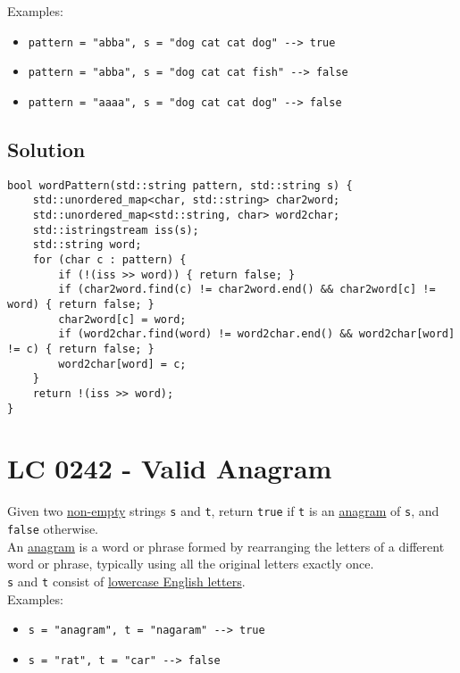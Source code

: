 {Examples:
\begin{itemize}
	\item {\colorbox{CodeBackground}{\lstinline|pattern = "abba", s = "dog cat cat dog" --> true|}}
	\item {\colorbox{CodeBackground}{\lstinline|pattern = "abba", s = "dog cat cat fish" --> false|}}
	\item {\colorbox{CodeBackground}{\lstinline|pattern = "aaaa", s = "dog cat cat dog" --> false|}}
\end{itemize}

\subsection*{Solution}
\begin{lstlisting}
bool wordPattern(std::string pattern, std::string s) {
	std::unordered_map<char, std::string> char2word;
	std::unordered_map<std::string, char> word2char;
	std::istringstream iss(s);
	std::string word;
	for (char c : pattern) {
		if (!(iss >> word)) { return false; }
		if (char2word.find(c) != char2word.end() && char2word[c] != word) { return false; }
		char2word[c] = word;
		if (word2char.find(word) != word2char.end() && word2char[word] != c) { return false; }
		word2char[word] = c;
	}
	return !(iss >> word);
}
\end{lstlisting}

\section{LC 0242 - Valid Anagram}\label{lc0242}
Given two \ul{non-empty} strings {\colorbox{CodeBackground}{\lstinline|s|}} and {\colorbox{CodeBackground}{\lstinline|t|}}, return {\colorbox{CodeBackground}{\lstinline|true|}} if {\colorbox{CodeBackground}{\lstinline|t|}} is an \ul{anagram} of {\colorbox{CodeBackground}{\lstinline|s|}}, and {\colorbox{CodeBackground}{\lstinline|false|}} otherwise.\\

An \ul{anagram} is a word or phrase formed by rearranging the letters of a different word or phrase, typically using all the original letters exactly once.\\

{\colorbox{CodeBackground}{\lstinline|s|}} and {\colorbox{CodeBackground}{\lstinline|t|}} consist of \ul{lowercase English letters}.\\

Examples:
\begin{itemize}
	\item {\colorbox{CodeBackground}{\lstinline|s = "anagram", t = "nagaram" --> true|}}
	\item {\colorbox{CodeBackground}{\lstinline|s = "rat", t = "car" --> false|}}
\end{itemize}

}
